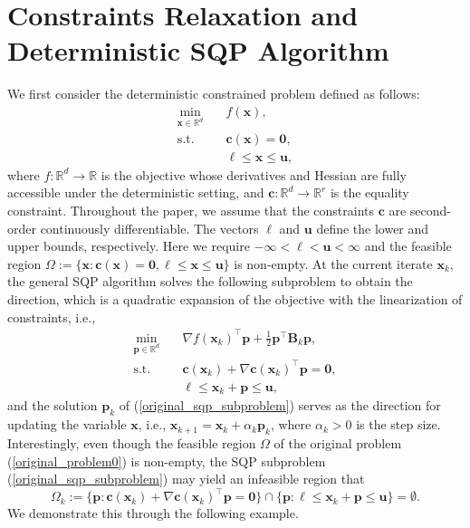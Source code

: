\documentclass[aos]{imsart}
\numberwithin{equation}{section}
\theoremstyle{plain}
\begin{document}
\section{Constraints Relaxation and Deterministic SQP Algorithm}
\label{sec:constraint_relaxation}
We first consider the deterministic constrained problem defined as follows:
\begin{equation}
\label{original_det_problem}
    \begin{split}
        \min_{\bm{x} \in \mathbb{R}^{d}} & \hspace{1em} f(\bm{x}), \\
        \text{s.t.} & \hspace{1em} \bm{c}(\bm{x}) = \bm{0},\\
        & \hspace{1em} \bm{\ell} \leq \bm{x} \leq \bm{u},
    \end{split}
\end{equation}
where $f: \mathbb{R}^{d} \to \mathbb{R}$ is the objective whose derivatives and Hessian are fully accessible under the deterministic setting, and  $\bm{c}: \mathbb{R}^{d} \to \mathbb{R}^{r}$ is the equality constraint. Throughout the paper, we assume that the constraints $\bm{c}$ are second-order continuously differentiable. 
The vectors $\bm{\ell}$ and $\bm{u}$ define the lower and upper bounds, respectively.
Here we require $-\infty < \bm{\ell} < \bm{u} < \infty$ and the feasible region $\Omega := \{\bm{x}: \bm{c}(\bm{x}) = \bm{0}, \bm{\ell} \leq \bm{x} \leq \bm{u}\}$ is non-empty. At the current iterate $\bm{x}_k$, the general SQP algorithm solves the following subproblem to obtain the direction, which is a quadratic expansion of the objective with the linearization of constraints, i.e.,
\begin{equation}
\label{original_sqp_subproblem}
    \begin{split}
        \min_{\bm{p} \in \mathbb{R}^{d}} & \hspace{1em}  \nabla f(\bm{x}_k)^{\top}\bm{p}+ \frac{1}{2}\bm{p}^{\top}\bm{B}_k\bm{p},\\
        \text{s.t.} & \hspace{1em} \bm{c}(\bm{x}_k)+\nabla \bm{c}(\bm{x}_k)^{\top}\bm{p} = \bm{0},\\
        & \hspace{1em} \bm{\ell} \leq \bm{x}_k + \bm{p} \leq \bm{u},
    \end{split}    
\end{equation}
and the solution $\bm{p}_k$ of (\ref{original_sqp_subproblem}) serves as the direction for updating the variable $\bm{x}$, i.e., $\bm{x}_{k+1} = \bm{x}_{k} + \alpha_k \bm{p}_k$, where $\alpha_k >0$ is the step size. Interestingly, even though the feasible region $\Omega$ of the original problem (\ref{original_problem0}) is non-empty, the SQP subproblem (\ref{original_sqp_subproblem}) may yield an infeasible region that
\begin{equation*}
    \Omega_k := \{\bm{p}: \bm{c}(\bm{x}_k)+\nabla \bm{c}(\bm{x}_k)^{\top}\bm{p} = \bm{0}\} \cap \{\bm{p}: \bm{\ell} \leq \bm{x}_k + \bm{p} \leq \bm{u}\} = \emptyset.
\end{equation*}
We demonstrate this through the following example.
\end{document}
